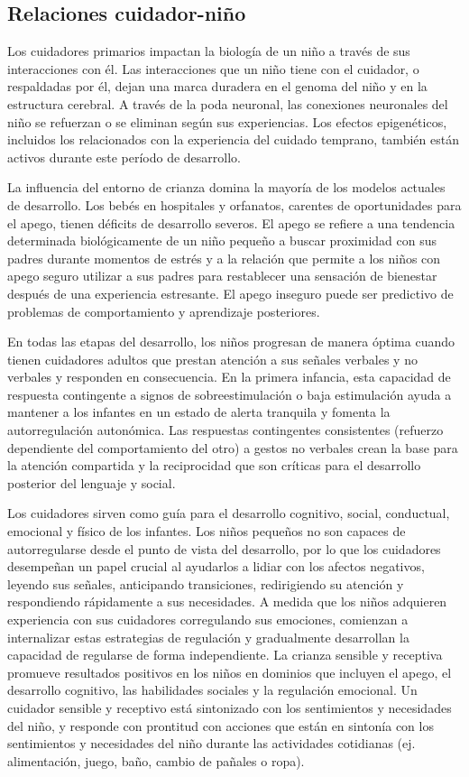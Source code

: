 \documentclass[11pt,letterpaper]{report}
\begin{document}
\subsection{Relaciones cuidador-niño}
Los cuidadores primarios impactan la biología de un niño a través de sus
interacciones con él. Las interacciones que un niño tiene con el cuidador, o
respaldadas por él, dejan una marca duradera en el genoma del niño y en la
estructura cerebral. A través de la poda neuronal, las conexiones neuronales
del niño se refuerzan o se eliminan según sus experiencias. Los efectos
epigenéticos, incluidos los relacionados con la experiencia del cuidado
temprano, también están activos durante este período de desarrollo.
\cite{Roth2011}

La influencia del entorno de crianza domina la mayoría de los modelos actuales
de desarrollo. Los bebés en hospitales y orfanatos, carentes de oportunidades
para el apego, tienen déficits de desarrollo severos. El apego se refiere a
una tendencia determinada biológicamente de un niño pequeño a buscar
proximidad con sus padres durante momentos de estrés y a la relación que
permite a los niños con apego seguro utilizar a sus padres para restablecer una
sensación de bienestar después de una experiencia estresante. El apego inseguro
puede ser predictivo de problemas de comportamiento y aprendizaje posteriores.
\cite{Nelson19}

En todas las etapas del desarrollo, los niños progresan de manera óptima
cuando tienen cuidadores adultos que prestan atención a sus señales verbales y
no verbales y responden en consecuencia. En la primera infancia, esta
capacidad de respuesta contingente a signos de sobreestimulación o baja
estimulación ayuda a mantener a los infantes en un estado de alerta tranquila y
fomenta la autorregulación autonómica. Las respuestas contingentes consistentes
(refuerzo dependiente del comportamiento del otro) a gestos no verbales crean
la base para la atención compartida y la reciprocidad que son críticas para el
desarrollo posterior del lenguaje y social. \cite{Nelson19}

Los cuidadores sirven como guía para el desarrollo cognitivo, social,
conductual, emocional y físico de los infantes. Los niños pequeños no son
capaces de autorregularse desde el punto de vista del desarrollo, por lo que
los cuidadores desempeñan un papel crucial al ayudarlos a lidiar con los
afectos negativos, leyendo sus señales, anticipando transiciones, redirigiendo
su atención y respondiendo rápidamente a sus necesidades. A medida que los
niños adquieren experiencia con sus cuidadores corregulando sus emociones,
comienzan a internalizar estas estrategias de regulación y gradualmente
desarrollan la capacidad de regularse de forma independiente. La crianza
sensible y receptiva promueve resultados positivos en los niños en dominios que
incluyen el apego, el desarrollo cognitivo, las habilidades sociales y la
regulación emocional. Un cuidador sensible y receptivo está sintonizado con los
sentimientos y necesidades del niño, y responde con prontitud con acciones que
están en sintonía con los sentimientos y necesidades del niño durante las
actividades cotidianas (ej. alimentación, juego, baño, cambio de pañales o
ropa). \cite{Feldman3}
\end{document}
